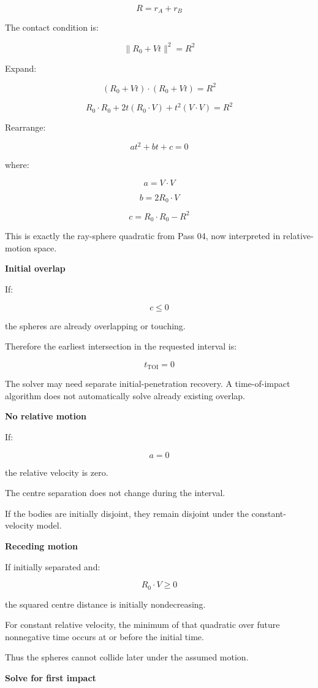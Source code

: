 \[
R=r_A+r_B
\]

The contact condition is:

\[
\boxed{ \|R_0+Vt\|^2=R^2 }
\]

Expand:

\[
(R_0+Vt)\cdot(R_0+Vt)=R^2
\]

\[
R_0\cdot R_0+ 2t(R_0\cdot V)+ t^2(V\cdot V)=R^2
\]

Rearrange:

\[
\boxed{ at^2+bt+c=0 }
\]

where:

\[
\boxed{ a=V\cdot V }
\]

\[
\boxed{ b=2R_0\cdot V }
\]

\[
\boxed{ c=R_0\cdot R_0-R^2 }
\]

This is exactly the ray-sphere quadratic from Pass 04, now interpreted in relative-motion space.

\textbf{Initial overlap}

If:

\[
c\le0
\]

the spheres are already overlapping or touching.

Therefore the earliest intersection in the requested interval is:

\[
\boxed{t_{\mathrm{TOI}}=0}
\]

The solver may need separate initial-penetration recovery. A time-of-impact algorithm does not automatically solve already existing overlap.

\textbf{No relative motion}

If:

\[
a=0
\]

the relative velocity is zero.

The centre separation does not change during the interval.

If the bodies are initially disjoint, they remain disjoint under the constant-velocity model.

\textbf{Receding motion}

If initially separated and:

\[
R_0\cdot V\ge0
\]

the squared centre distance is initially nondecreasing.

For constant relative velocity, the minimum of that quadratic over future nonnegative time occurs at or before the initial time.

Thus the spheres cannot collide later under the assumed motion.

\textbf{Solve for first impact}

